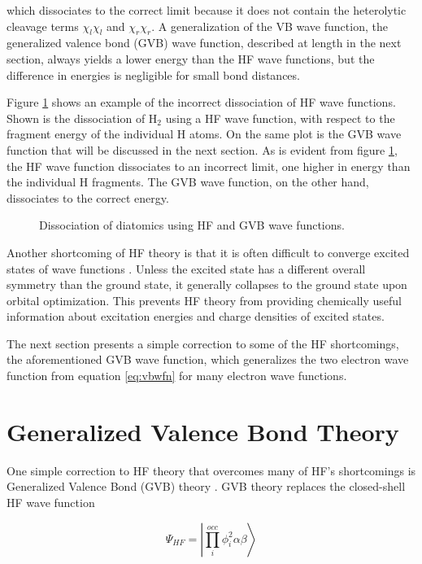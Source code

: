 \noindent which dissociates to the correct limit because it does not
contain the heterolytic cleavage terms $\chi_l\chi_l$ and
$\chi_r\chi_r$. A generalization of the VB wave function, the
generalized valence bond (GVB) wave function, described at length in
the next section, always yields a lower energy than the HF wave
functions, but the difference in energies is negligible for small bond
distances.

Figure \ref{fig:gvb} shows an example of the incorrect dissociation of
HF wave functions. Shown is the dissociation of H$_2$ using a HF wave
function, with respect to the fragment energy of the individual H
atoms. On the same plot is the GVB wave function that will be
discussed in the next section. As is evident from figure
\ref{fig:gvb}, the HF wave function dissociates to an incorrect limit,
one higher in energy than the individual H fragments. The GVB wave
function, on the other hand, dissociates to the correct energy. 

\begin{figure}
\caption{Dissociation of diatomics using HF and GVB wave functions.} 
\label{fig:gvb}
\end{figure}

Another shortcoming of HF theory is that it is often difficult to
converge excited states of wave functions \cite{Foresman92}. Unless
the excited state has a different overall symmetry than the ground
state, it generally collapses to the ground state upon orbital
optimization. This prevents HF theory from providing chemically useful
information about excitation energies and charge densities of excited
states.  

The next section presents a simple correction to some of the HF
shortcomings, the aforementioned GVB wave function, which generalizes
the two electron wave function from equation \ref{eq:vbwfn} for many
electron wave functions.

\section{Generalized Valence Bond Theory}
\label{sec2.6}
One simple correction to HF theory that overcomes many of HF's
shortcomings is Generalized Valence Bond (GVB)
theory \cite{Bobrowicz77,Hunt70,Bair77,Yaffe76}. GVB theory replaces
the closed-shell HF wave function 

\begin{equation}
	\Psi_{HF} = \left|\prod_i^{occ}\phi_i^2\alpha\beta
	\right\rangle
\label{eq:gvbhfwfn}
\end{equation}


